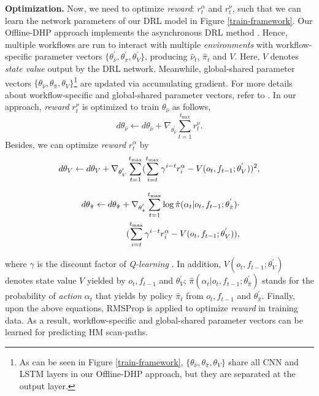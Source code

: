 \documentclass[10pt,journal,compsoc]{IEEEtran}
\begin{document}
\textbf{Optimization.}
Now, we need to optimize \textit{reward}: $r^{\alpha}_t$ and $r^{\nu}_t$, such that we can learn the network parameters of our DRL model in Figure \ref{train-framework}.
Our Offline-DHP approach implements the asynchronous DRL method \cite{mnih2016asynchronous}.
Hence, multiple workflows are run to interact with multiple \textit{environments} with workflow-specific parameter vectors $\{ \theta^{'}_{\hat{\nu}}, \theta^{'}_{\hat{\pi}}, \theta^{'}_{V} \}$, producing $\hat{\nu}_t$, $\hat{\pi}_t$ and $V$.
Here, $V$ denotes \textit{state value} output by the DRL network.
Meanwhile, global-shared parameter vectors $\{ \theta_{\hat{\nu}}, \theta_{\hat{\pi}}, \theta_{V} \}$\footnote{As can be seen in Figure \ref{train-framework}, $\{ \theta_{\hat{\nu}}, \theta_{\hat{\pi}}, \theta_{V} \}$ share all CNN and LSTM layers in our Offline-DHP approach, but they are separated at the output layer.} are updated via accumulating gradient.
For more details about workflow-specific and global-shared parameter vectors, refer to \cite{mnih2016asynchronous}.
In our approach, \textit{reward} $r^{\nu}_t$ is optimized to train $\theta_{\hat{\nu}}$ as follows,
\begin{equation}
\label{opt-1}
d \theta_{\hat{\nu}} \leftarrow d \theta_{\hat{\nu}} + \nabla_{\theta_{\hat{\nu}}^{'}} \sum_{t=1}^{t_{\text{max}}} r^{\nu}_t.
\end{equation}
Besides, we can optimize \textit{reward} $r^{\alpha}_t$ by
\begin{equation}
\label{opt-2}
\small d \theta_{V} \leftarrow d \theta_{V} + \nabla_{\theta_{V}^{'}} \sum_{t = 1}^{t_{\text{max}}} (\sum_{i=t}^{t_{\text{max}}} \gamma^{i-t} r^{\alpha}_{i} - V(o_{t}, f_{t-1} ; \theta_{V}^{'}))^2,
\end{equation}
\begin{small}
\begin{eqnarray}
\label{opt-3}
\hspace{0.1cm} \nonumber d \theta_{\hat{\pi}} \leftarrow d \theta_{\hat{\pi}} +\nabla_{\theta_{\hat{\pi}}^{'}} \sum_{t = 1}^{t_{\text{max}}} \log \hat{\pi}( \alpha_{t} | o_{t}, f_{t-1} ; \theta_{\hat{\pi}}^{'})\cdot \\
(\sum_{i = t}^{t_{\text{max}}} \gamma^{i-t} r^{\alpha}_{i} - V(o_{t}, f_{t-1} ; \theta_{V}^{'})),
\end{eqnarray}
\end{small}
where $\gamma$ is the discount factor of \textit{Q-learning} \cite{watkins1992q}.
In addition, $V(o_{t}, f_{t-1} ; \theta_{V}^{'})$ denotes state value $V$ yielded by $o_{t}, f_{t-1}$ and $\theta_{V}^{'}$; $\hat{\pi}( \alpha_{t} | o_{t}, f_{t-1} ; \theta_{\hat{\pi}}^{'})$ stands for the probability of \textit{action} $\alpha_{t}$ that yields by policy $\hat{\pi}_t$ from $o_{t}, f_{t-1}$ and $\theta_{\hat{\pi}}^{'}$.
Finally, upon the above equations, RMSProp \cite{tieleman2012lecture} is applied to optimize \textit{reward} in training data. As a result, workflow-specific and global-shared parameter vectors can be learned for predicting HM scan-paths.
\end{document}
